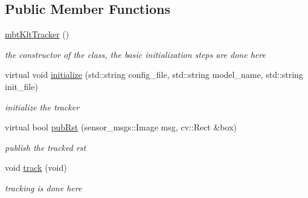 \subsection*{\-Public \-Member \-Functions}
\begin{DoxyCompactItemize}
\item 
\hypertarget{classmbtKltTracker_ac7bd3fb4472175c6e950eb5c29148d0e}{\hyperlink{classmbtKltTracker_ac7bd3fb4472175c6e950eb5c29148d0e}{mbt\-Klt\-Tracker} ()}\label{classmbtKltTracker_ac7bd3fb4472175c6e950eb5c29148d0e}

\begin{DoxyCompactList}\small\item\em the constructor of the class, the basic initialization steps are done here \end{DoxyCompactList}\item 
\hypertarget{classmbtKltTracker_ae4746069ef2f9b24db30970ac353eae5}{virtual void \hyperlink{classmbtKltTracker_ae4746069ef2f9b24db30970ac353eae5}{initialize} (std\-::string config\-\_\-file, std\-::string model\-\_\-name, std\-::string init\-\_\-file)}\label{classmbtKltTracker_ae4746069ef2f9b24db30970ac353eae5}

\begin{DoxyCompactList}\small\item\em initialize the tracker \end{DoxyCompactList}\item 
virtual bool \hyperlink{classmbtKltTracker_a8e2db146326617d41012b83fe34e15af}{pub\-Rst} (sensor\-\_\-msgs\-::\-Image msg, cv\-::\-Rect \&box)
\begin{DoxyCompactList}\small\item\em publish the tracked rst \end{DoxyCompactList}\item 
\hypertarget{classmbtKltTracker_ab4d84810ff270978235e0eb0cd92e7e6}{void \hyperlink{classmbtKltTracker_ab4d84810ff270978235e0eb0cd92e7e6}{track} (void)}\label{classmbtKltTracker_ab4d84810ff270978235e0eb0cd92e7e6}

\begin{DoxyCompactList}\small\item\em tracking is done here \end{DoxyCompactList}\end{DoxyCompactItemize}


